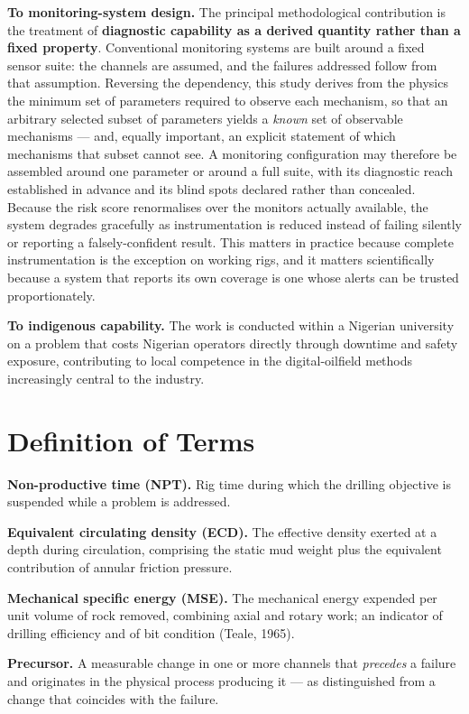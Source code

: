 \documentclass[12pt,a4paper]{report}
\begin{document}
\textbf{To monitoring-system design.} The principal methodological contribution is the treatment of
\textbf{diagnostic capability as a derived quantity rather than a fixed property}. Conventional monitoring
systems are built around a fixed sensor suite: the channels are assumed, and the failures addressed follow
from that assumption. Reversing the dependency, this study derives from the physics the minimum set of
parameters required to observe each mechanism, so that an arbitrary selected subset of parameters yields a
\emph{known} set of observable mechanisms --- and, equally important, an explicit statement of which mechanisms
that subset cannot see. A monitoring configuration may therefore be assembled around one parameter or
around a full suite, with its diagnostic reach established in advance and its blind spots declared rather
than concealed. Because the risk score renormalises over the monitors actually available, the system
degrades gracefully as instrumentation is reduced instead of failing silently or reporting a
falsely-confident result. This matters in practice because complete instrumentation is the exception on
working rigs, and it matters scientifically because a system that reports its own coverage is one whose
alerts can be trusted proportionately.

\textbf{To indigenous capability.} The work is conducted within a Nigerian university on a problem that costs
Nigerian operators directly through downtime and safety exposure, contributing to local competence in the
digital-oilfield methods increasingly central to the industry.

\section{Definition of Terms}

\textbf{Non-productive time (NPT).} Rig time during which the drilling objective is suspended while a problem
is addressed.

\textbf{Equivalent circulating density (ECD).} The effective density exerted at a depth during circulation,
comprising the static mud weight plus the equivalent contribution of annular friction pressure.

\textbf{Mechanical specific energy (MSE).} The mechanical energy expended per unit volume of rock removed,
combining axial and rotary work; an indicator of drilling efficiency and of bit condition (Teale, 1965).

\textbf{Precursor.} A measurable change in one or more channels that \emph{precedes} a failure and originates in the
physical process producing it --- as distinguished from a change that coincides with the failure.
\end{document}
